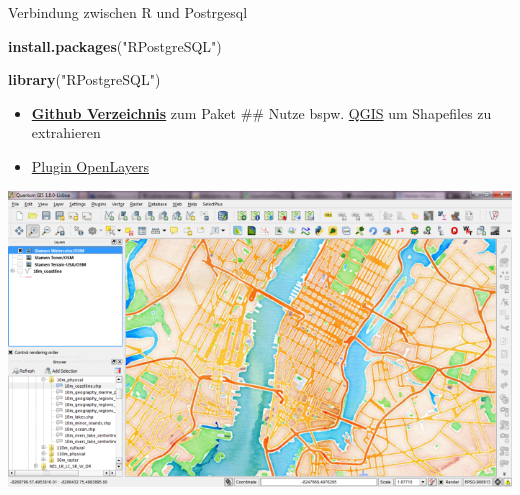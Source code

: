 \documentclass[ignorenonframetext,]{beamer}
\newenvironment{Shaded}{\begin{snugshade}}{\end{snugshade}}
\newcommand{\KeywordTok}[1]{\textcolor[rgb]{0.13,0.29,0.53}{\textbf{#1}}}
\newcommand{\NormalTok}[1]{#1}
\newcommand{\StringTok}[1]{\textcolor[rgb]{0.31,0.60,0.02}{#1}}
\begin{document}
\begin{frame}[fragile]{Verbindung zwischen R und Postrgesql}
\protect\hypertarget{verbindung-zwischen-r-und-postrgesql}{}

\begin{Shaded}
\begin{Highlighting}[]
\KeywordTok{install.packages}\NormalTok{(}\StringTok{"RPostgreSQL"}\NormalTok{)}
\end{Highlighting}
\end{Shaded}

\begin{Shaded}
\begin{Highlighting}[]
\KeywordTok{library}\NormalTok{(}\StringTok{"RPostgreSQL"}\NormalTok{)}
\end{Highlighting}
\end{Shaded}

\begin{itemize}
\item
  \href{https://github.com/tomoakin/RPostgreSQL}{\textbf{Github
  Verzeichnis}} zum Paket \#\# Nutze bspw.
  \href{http://www.qgis.org/de/site/}{QGIS} um Shapefiles zu extrahieren
\item
  \href{http://www.qgistutorials.com/de/docs/downloading_osm_data.html}{Plugin
  OpenLayers}
\end{itemize}

\includegraphics{figure/stamen_watercolor1.png}

\end{frame}
\end{document}
